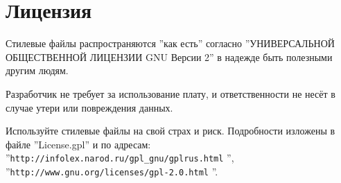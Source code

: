 \section{Лицензия}
Стилевые файлы распространяются ''как есть'' согласно ''УНИВЕРСАЛЬНОЙ ОБЩЕСТВЕННОЙ ЛИЦЕНЗИИ GNU Версии 2'' в надежде быть полезными другим людям. 

Разработчик не требует за использование плату, и ответственности не несёт в случае утери или повреждения данных. 

Используйте стилевые файлы на свой страх и риск. Подробности изложены в файле ''License.gpl'' и по адресам:\\ ''\verb|http://infolex.narod.ru/gpl_gnu/gplrus.html| '',\\ ''\verb|http://www.gnu.org/licenses/gpl-2.0.html| ''.

